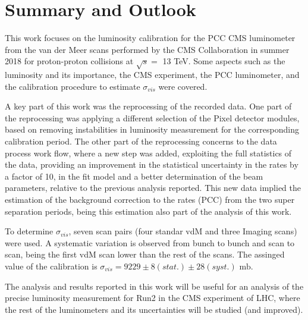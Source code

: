 \chapter{Summary and Outlook}
This work focuses on the luminosity calibration for the PCC CMS luminometer from the van der Meer scans performed by the CMS Collaboration in summer 2018 for proton-proton collisions at $\sqrt{s}=$ 13 TeV. Some aspects such as the luminosity and its importance, the CMS experiment, the PCC luminometer, and the calibration procedure to estimate $\sigma_{vis}$ were covered.

A key part of this work was the reprocessing of the recorded data. One part of the reprocessing was applying a different selection of the Pixel detector modules, based on removing instabilities in luminosity measurement for the corresponding calibration period. The other part of the reprocessing concerns to the data process work flow, where a new step was added, exploiting the full statistics of the data, providing an improvement in the statistical uncertainty in the rates by a factor of 10, in the fit model and a better determination of the beam parameters, relative to the previous analysis reported. This new data implied the estimation of the background correction to the rates (PCC) from the two super separation periods, being this estimation also part of the analysis of this work.

To determine $\sigma_{vis}$, seven scan pairs (four standar vdM and three Imaging scans) were used. A systematic variation is observed from bunch to bunch and scan to scan, being the first vdM scan lower than the rest of the scans. The assinged value of the calibration is $\sigma_{vis}= 9229 \pm 8(stat.)\pm 28 (syst.) \text{ mb}$.

The analysis and results reported in this work will be useful for an analysis of the precise luminosity measurement for Run2 in the CMS experiment of LHC, where the rest of the luminometers and its uncertainties will be studied (and improved).







